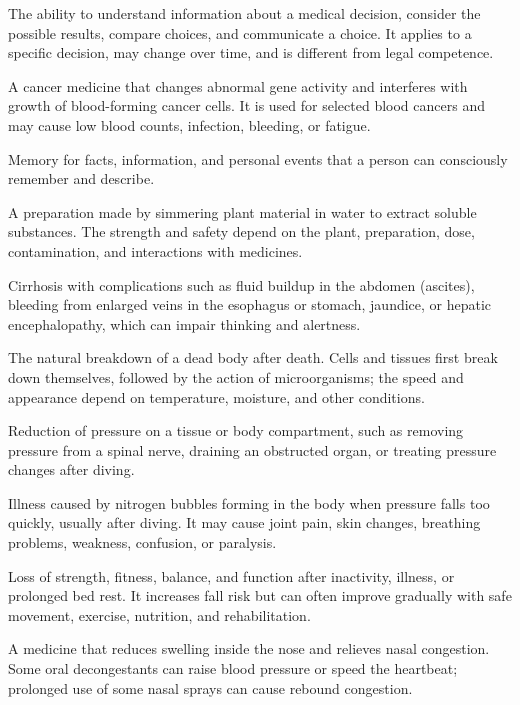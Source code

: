  The ability to understand information about a medical decision, consider the possible results, compare choices, and communicate a choice. It applies to a specific decision, may change over time, and is different from legal competence.

 A cancer medicine that changes abnormal gene activity and interferes with growth of blood-forming cancer cells. It is used for selected blood cancers and may cause low blood counts, infection, bleeding, or fatigue.

 Memory for facts, information, and personal events that a person can consciously remember and describe.

 A preparation made by simmering plant material in water to extract soluble substances. The strength and safety depend on the plant, preparation, dose, contamination, and interactions with medicines.

 Cirrhosis with complications such as fluid buildup in the abdomen (ascites), bleeding from enlarged veins in the esophagus or stomach, jaundice, or hepatic encephalopathy, which can impair thinking and alertness.

 The natural breakdown of a dead body after death. Cells and tissues first break down themselves, followed by the action of microorganisms; the speed and appearance depend on temperature, moisture, and other conditions.

 Reduction of pressure on a tissue or body compartment, such as removing pressure from a spinal nerve, draining an obstructed organ, or treating pressure changes after diving.

 Illness caused by nitrogen bubbles forming in the body when pressure falls too quickly, usually after diving. It may cause joint pain, skin changes, breathing problems, weakness, confusion, or paralysis.

 Loss of strength, fitness, balance, and function after inactivity, illness, or prolonged bed rest. It increases fall risk but can often improve gradually with safe movement, exercise, nutrition, and rehabilitation.

 A medicine that reduces swelling inside the nose and relieves nasal congestion. Some oral decongestants can raise blood pressure or speed the heartbeat; prolonged use of some nasal sprays can cause rebound congestion.

